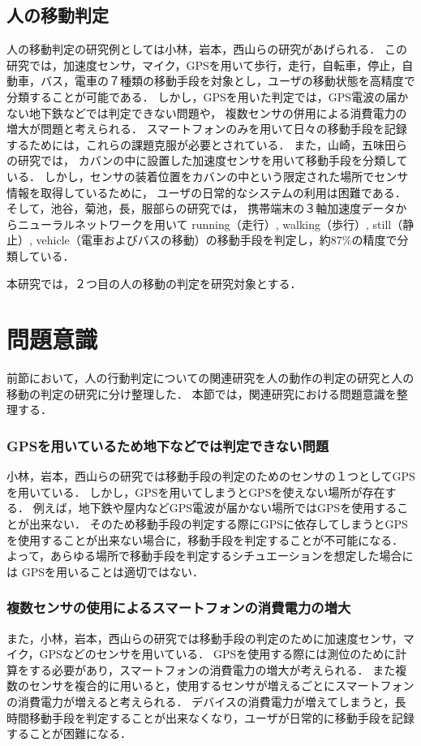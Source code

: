 \subsection{人の移動判定}
人の移動判定の研究例としては小林，岩本，西山らの研究\cite{釈迦}があげられる．
この研究では，加速度センサ，マイク，GPSを用いて歩行，走行，自転車，停止，自動車，バス，電車の７種類の移動手段を対象とし，ユーザの移動状態を高精度で分類することが可能である．
しかし，GPSを用いた判定では，GPS電波の届かない地下鉄などでは判定できない問題や，
複数センサの併用による消費電力の増大が問題と考えられる．
スマートフォンのみを用いて日々の移動手段を記録するためには，これらの課題克服が必要とされている．
また，山崎，五味田らの研究\cite{山崎亜希子:2008-03-13}では，
カバンの中に設置した加速度センサを用いて移動手段を分類している．
しかし，センサの装着位置をカバンの中という限定された場所でセンサ情報を取得しているために，
ユーザの日常的なシステムの利用は困難である．
そして，池谷，菊池，長，服部らの研究\cite{池谷直紀:2008-07-10}では，
携帯端末の３軸加速度データからニューラルネットワークを用いて
running（走行）, walking（歩行）, still（静止）, vehicle（電車およびバスの移動）の移動手段を判定し，約87\%の精度で分類している．

本研究では，２つ目の人の移動の判定を研究対象とする．

\section{問題意識}
前節において，人の行動判定についての関連研究を人の動作の判定の研究と人の移動の判定の研究に分け整理した．
本節では，関連研究における問題意識を整理する．
\subsubsection*{GPSを用いているため地下などでは判定できない問題}
小林，岩本，西山らの研究では移動手段の判定のためのセンサの１つとしてGPSを用いている．
しかし，GPSを用いてしまうとGPSを使えない場所が存在する．
例えば，地下鉄や屋内などGPS電波が届かない場所ではGPSを使用することが出来ない．
そのため移動手段の判定する際にGPSに依存してしまうとGPSを使用することが出来ない場合に，移動手段を判定することが不可能になる．
よって，あらゆる場所で移動手段を判定するシチュエーションを想定した場合には
GPSを用いることは適切ではない．
\subsubsection*{複数センサの使用によるスマートフォンの消費電力の増大}
また，小林，岩本，西山らの研究では移動手段の判定のために加速度センサ，マイク，GPSなどのセンサを用いている．
GPSを使用する際には測位のために計算をする必要があり，スマートフォンの消費電力の増大が考えられる．
また複数のセンサを複合的に用いると，使用するセンサが増えるごとにスマートフォンの消費電力が増えると考えられる．
デバイスの消費電力が増えてしまうと，長時間移動手段を判定することが出来なくなり，ユーザが日常的に移動手段を記録することが困難になる．
